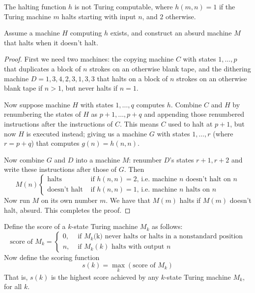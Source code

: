 \begin{theorem}
  The halting function $h$ is not Turing computable, where $h(m,n) = 1$ if the Turing machine $m$ halts starting with input $n$, and $2$ otherwise.
\end{theorem}
\begin{proofidea}
  Assume a machine $H$ computing $h$ exists, and construct an absurd machine $M$ that halts when it doesn't halt.
\end{proofidea}
\begin{proof}
  First we need two machines: the copying machine $C$ with states $1,\ldots,p$ that duplicates a block of $n$ strokes on an otherwise blank tape, and the dithering machine $D = 1,3,4,2,3,1,3,3$ that halts on a block of $n$ strokes on an otherwise blank tape if $n > 1$, but never halts if $n=1$.

  Now suppose machine $H$ with states $1,\ldots,q$ computes $h$.
  Combine $C$ and $H$ by renumbering the states of $H$ as $p + 1, \ldots, p + q$ and appending those renumbered instructions after the instructions of $C$.
  This means $C$ used to halt at $p+1$, but now $H$ is executed instead; giving us a machine $G$ with states $1,\ldots,r$ (where $r=p+q$) that computes $g(n)=h(n,n)$.

  Now combine $G$ and $D$ into a machine $M$: renumber $D$'s states $r+1,r+2$ and write these instructions after those of $G$.
  Then
  \begin{equation*}
    M(n) \begin{cases}
      \text{halts} &\text{ if }h(n,n)=2\text{, i.e. machine $n$ doesn't halt on $n$}\\
      \text{doesn't halt} &\text{ if }h(n,n)=1\text{, i.e. machine $n$ halts on $n$}
    \end{cases}
  \end{equation*}
  Now run $M$ on its own number $m$.
  We have that $M(m)$ halts if $M(m)$ doesn't halt, absurd.
  This completes the proof.
\end{proof}

Define the score of a $k$-state Turing machine $M_k$ as follows:
\begin{equation*}
  \text{score of $M_k$} = \begin{cases}
    0, &\text{ if $M_k$(k) never halts or halts in a nonstandard position}\\
    n, &\text{ if $M_k(k)$ halts with output $n$}
  \end{cases}
\end{equation*}
Now define the scoring function
\begin{equation*}
  s(k) = \max\limits_k \left(\text{score of $M_k$}\right)
\end{equation*}
That is, $s(k)$ is the highest score achieved by any $k$-state Turing machine $M_k$, for all $k$.


